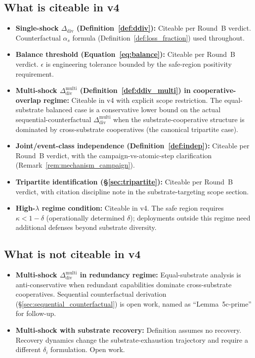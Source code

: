 \documentclass{article}
\newcommand{\Ddiv}{\Delta_{\mathrm{div}}}
\begin{document}
\subsection{What is citeable in v4}

\begin{itemize}
\item \textbf{Single-shock $\Ddiv$ (Definition~\ref{def:ddiv}):}
  Citeable per Round~B verdict.  Counterfactual $\alpha_s$ formula
  (Definition~\ref{def:loss_fraction}) used throughout.

\item \textbf{Balance threshold (Equation~\ref{eq:balance}):}
  Citeable per Round~B verdict.  $\epsilon$ is engineering
  tolerance bounded by the safe-region positivity requirement.

\item \textbf{Multi-shock $\Ddiv^{\mathrm{multi}}$
  (Definition~\ref{def:ddiv_multi}) in cooperative-overlap regime:}
  Citeable in v4 with explicit scope restriction.  The
  equal-substrate balanced case is a conservative lower bound on
  the actual sequential-counterfactual $\Ddiv^{\mathrm{multi}}$
  when the substrate-cooperative structure is dominated by
  cross-substrate cooperatives (the canonical tripartite case).

\item \textbf{Joint/event-class independence (Definition~\ref{def:indep}):}
  Citeable per Round~B verdict, with the campaign-vs-atomic-step
  clarification (Remark~\ref{rem:mechanism_campaign}).

\item \textbf{Tripartite identification (\S\ref{sec:tripartite}):}
  Citeable per Round~B verdict, with citation discipline note in
  the substrate-targeting scope section.

\item \textbf{High-$\lambda$ regime condition:}  Citeable in v4.
  The safe region requires $\kappa < 1 - \delta$ (operationally
  determined $\delta$); deployments outside this regime need
  additional defenses beyond substrate diversity.
\end{itemize}

\subsection{What is not citeable in v4}

\begin{itemize}
\item \textbf{Multi-shock $\Ddiv^{\mathrm{multi}}$ in
  redundancy regime:} Equal-substrate analysis is anti-conservative
  when redundant capabilities dominate cross-substrate cooperatives.
  Sequential counterfactual derivation
  (\S\ref{sec:sequential_counterfactual}) is open work,
  named as ``Lemma~5c-prime'' for follow-up.

\item \textbf{Multi-shock with substrate recovery:} Definition
  assumes no recovery.  Recovery dynamics change the
  substrate-exhaustion trajectory and require a different
  $\delta_i$ formulation.  Open work.
\end{itemize}
\end{document}

